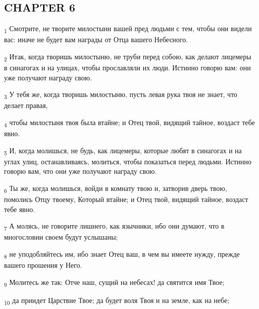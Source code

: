 \subsection{CHAPTER 6}
\begin{tcolorbox}
\textsubscript{1} Смотрите, не творите милостыни вашей пред людьми с тем, чтобы они видели вас: иначе не будет вам награды от Отца вашего Небесного.
\end{tcolorbox}
\begin{tcolorbox}
\textsubscript{2} Итак, когда творишь милостыню, не труби перед собою, как делают лицемеры в синагогах и на улицах, чтобы прославляли их люди. Истинно говорю вам: они уже получают награду свою.
\end{tcolorbox}
\begin{tcolorbox}
\textsubscript{3} У тебя же, когда творишь милостыню, пусть левая рука твоя не знает, что делает правая,
\end{tcolorbox}
\begin{tcolorbox}
\textsubscript{4} чтобы милостыня твоя была втайне; и Отец твой, видящий тайное, воздаст тебе явно.
\end{tcolorbox}
\begin{tcolorbox}
\textsubscript{5} И, когда молишься, не будь, как лицемеры, которые любят в синагогах и на углах улиц, останавливаясь, молиться, чтобы показаться перед людьми. Истинно говорю вам, что они уже получают награду свою.
\end{tcolorbox}
\begin{tcolorbox}
\textsubscript{6} Ты же, когда молишься, войди в комнату твою и, затворив дверь твою, помолись Отцу твоему, Который втайне; и Отец твой, видящий тайное, воздаст тебе явно.
\end{tcolorbox}
\begin{tcolorbox}
\textsubscript{7} А молясь, не говорите лишнего, как язычники, ибо они думают, что в многословии своем будут услышаны;
\end{tcolorbox}
\begin{tcolorbox}
\textsubscript{8} не уподобляйтесь им, ибо знает Отец ваш, в чем вы имеете нужду, прежде вашего прошения у Него.
\end{tcolorbox}
\begin{tcolorbox}
\textsubscript{9} Молитесь же так: Отче наш, сущий на небесах! да святится имя Твое;
\end{tcolorbox}
\begin{tcolorbox}
\textsubscript{10} да приидет Царствие Твое; да будет воля Твоя и на земле, как на небе;
\end{tcolorbox}
